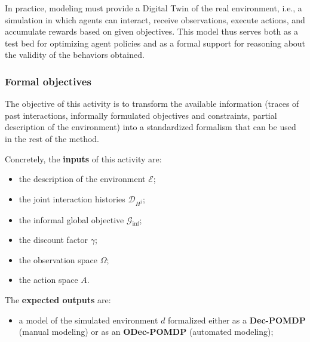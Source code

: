 \documentclass[pdflatex,sn-mathphys-num]{sn-jnl}%
\theoremstyle{thmstyleone}%
\theoremstyle{thmstyletwo}%
\theoremstyle{thmstylethree}%
\begin{document}
In practice, modeling must provide a Digital Twin of the real environment, i.e., a simulation in which agents can interact, receive observations, execute actions, and accumulate rewards based on given objectives. This model thus serves both as a test bed for optimizing agent policies and as a formal support for reasoning about the validity of the behaviors obtained.

\subsubsection*{Formal objectives}
The objective of this activity is to transform the available information (traces of past interactions, informally formulated objectives and constraints, partial description of the environment) into a standardized formalism that can be used in the rest of the method.

Concretely, the \textbf{inputs} of this activity are:
\begin{itemize}
    \item the description of the environment $\mathcal{E}$;
    \item the joint interaction histories $\mathcal{D}_{H^j}$;
    \item the informal global objective $\mathcal{G}_{\text{inf}}$;
    \item the discount factor $\gamma$;
    \item the observation space $\Omega$;
    \item the action space $A$.
\end{itemize}

\noindent
The \textbf{expected outputs} are:
\begin{itemize}
    \item a model of the simulated environment $d$ formalized either as a \textbf{Dec-POMDP} (manual modeling) or as an \textbf{ODec-POMDP} (automated modeling);
\end{itemize}
\end{document}
